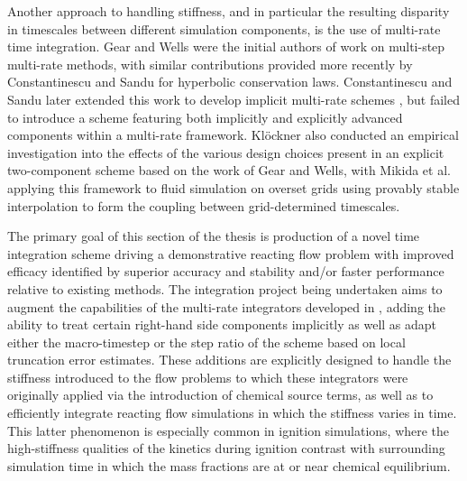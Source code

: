 Another approach to handling stiffness, and in particular the resulting disparity in
timescales between different simulation components, is the use of multi-rate
time integration. Gear and Wells \cite{gear1984multirate} were the initial authors of
work on multi-step multi-rate methods, with similar contributions provided more
recently by Constantinescu and Sandu \cite{constantinescu2007multirate} for hyperbolic
conservation laws. Constantinescu and Sandu later extended this work to develop implicit
multi-rate schemes \cite{constantinescu2010extrapolated,
constantinescu2013extrapolated}, but failed to introduce a scheme featuring both
implicitly and explicitly advanced components within a multi-rate framework. Kl\"{o}ckner
\cite{klockner2010high} also conducted an empirical investigation into the effects of the various design choices
present in an explicit two-component scheme based on the work of Gear and Wells, with Mikida et al.
\cite{mikida2019multi} applying this framework to fluid simulation on overset grids using provably stable
interpolation to form the coupling between grid-determined timescales.


The primary goal of this section of the thesis is production of a novel
time integration scheme driving a demonstrative reacting flow problem
with improved efficacy identified by superior accuracy and stability and/or
faster performance relative to existing methods. The integration project
being undertaken aims to augment the capabilities of the multi-rate integrators
developed in \cite{mikida2019multi}, adding the ability to treat certain
right-hand side components implicitly as well as adapt either the macro-timestep
or the step ratio of the scheme based on local truncation error estimates. These
additions are explicitly designed to handle the stiffness introduced to the flow
problems to which these integrators were originally applied via the introduction
of chemical source terms, as well as to efficiently integrate reacting flow
simulations in which the stiffness varies in time. This latter phenomenon is especially
common in ignition simulations, where the high-stiffness qualities of the
kinetics during ignition contrast with surrounding simulation time in which
the mass fractions are at or near chemical equilibrium.

